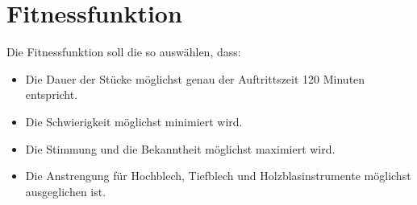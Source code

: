 \section{Fitnessfunktion}\label{sec:fitness}
Die Fitnessfunktion soll die so auswählen, dass: 
\begin{itemize}
    \item Die Dauer der Stücke möglichst genau der Auftrittszeit 120 Minuten entspricht.
    \item Die Schwierigkeit möglichst minimiert wird.
    \item Die Stimmung und die Bekanntheit möglichst maximiert wird.
    \item Die Anstrengung für Hochblech, Tiefblech und Holzblasinstrumente möglichst ausgeglichen ist.
\end{itemize}


